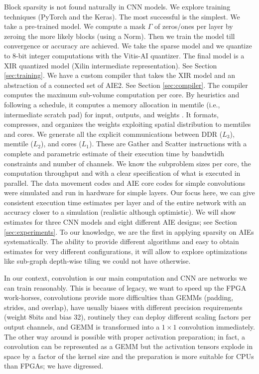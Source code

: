 \documentclass{IEEEtran}
\begin{document}
Block sparsity is not found naturally in CNN models. We explore
training techniques (PyTorch and the Keras).  The most successful is
the simplest. We take a pre-trained model. We compute a mask $\Gamma$
of zeros/ones per layer by zeroing the more likely blocks (using a
Norm). Then we train the model till convergence or accuracy are
achieved. We take the sparse model and we quantize to 8-bit integer
computations with the Vitis-AI quantizer. The final model is a XIR
quantized model (Xilin intermediate representation). See Section
\ref{sec:training}. We have a custom compiler that takes the XIR model
and an abstraction of a connected set of AIE2. See Section
\ref{sec:compiler}. The compiler computes the maximum sub-volume
computation per core. By heuristics and following a schedule, it
computes a memory allocation in memtile (i.e., intermediate scratch
pad) for input, outputs, and weights . It formats, compresses, and
organizes the weights exploiting spatial distribution to memtiles and
cores. We generate all the explicit communications between DDR
($L_3$), memtile ($L_2$), and cores ($L_1$). These are Gather and
Scatter instructions with a complete and parametric estimate of their
execution time by bandwtidh constraints and number of channels. We
know the subproblem sizes per core, the computation throughput and
with a clear specification of what is executed in parallel. The data
movement codes and AIE core codes for simple convolutions were
simulated and run in hardware for simple layers. Our focus here, we
can give consistent execution time estimates per layer and of the
entire network with an accuracy closer to a simulation (realistic
although optimistic).  We will show estimates for three CNN models and
eight different AIE designs; see Section \ref{sec:experiments}. To our
knowledge, we are the first in applying sparsity on AIEs
systematically. The ability to provide different algorithms and easy
to obtain estimates for very different configurations, it will allow
to explore optimizations like sub-graph depth-wise tiling we could not
have otherwise.

In our context, convolution is our main computation and CNN are
networks we can train reasonably. This is because of legacy, we want
to speed up the FPGA work-horses, convolutions provide more
difficulties than GEMMs (padding, strides, and overlap), have usually
biases with different precision requirements (weight 8bits and bias
32), routinely they can deploy different scaling factors per output
channels, and GEMM is transformed into a $1 \times 1$ convolution
immediately. The other way around is possible with proper activation
preparation; in fact, a convolution can be represented as a GEMM but
the activation tensors explode in space by a factor of the kernel size
and the preparation is more suitable for CPUs than FPGAs; we have
digressed.
\end{document}
